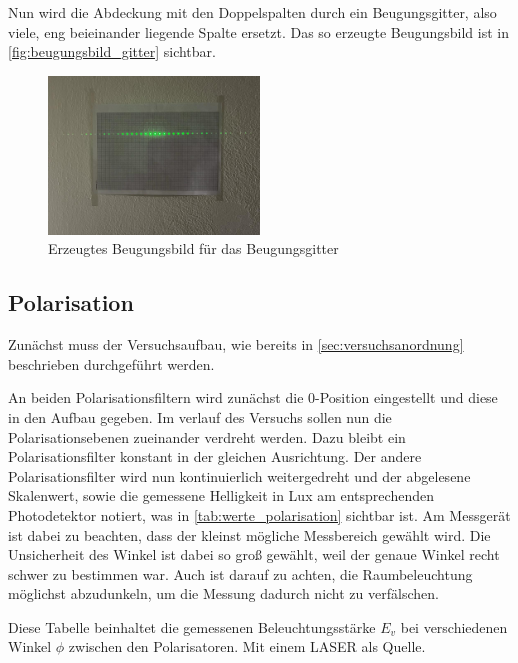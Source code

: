 \documentclass[12pt,english,ngerman]{scrartcl}
\begin{document}
Nun wird die Abdeckung mit den Doppelspalten durch ein Beugungsgitter, also
viele, eng beieinander liegende Spalte ersetzt. Das so erzeugte Beugungsbild
ist in \autoref{fig:beugungsbild_gitter} sichtbar.

\begin{figure}[H]
	\begin{center}
		\includegraphics[width =0.5\textwidth]{./figures/beugungsbild_gitter.jpg}
	\end{center}
	\caption[ Erzeugtes Beugungsbild für das Beugungsgitter] { Erzeugtes Beugungsbild für das
		Beugungsgitter
	}\label{fig:beugungsbild_gitter}
\end{figure}

\subsection{Polarisation}

Zunächst muss der Versuchsaufbau, wie bereits in
\autoref{sec:versuchsanordnung} beschrieben durchgeführt werden.

An beiden Polarisationsfiltern wird zunächst die 0-Position eingestellt und
diese in den Aufbau gegeben. Im verlauf des Versuchs sollen nun die
Polarisationsebenen zueinander verdreht werden. Dazu bleibt ein
Polarisationsfilter konstant in der gleichen Ausrichtung. Der andere
Polarisationsfilter wird nun kontinuierlich weitergedreht und der abgelesene
Skalenwert, sowie die gemessene Helligkeit in Lux am entsprechenden
Photodetektor notiert, was in \autoref{tab:werte_polarisation} sichtbar ist. Am
Messgerät ist dabei zu beachten, dass der kleinst mögliche Messbereich gewählt
wird. Die Unsicherheit des Winkel ist dabei so groß gewählt, weil der genaue
Winkel recht schwer zu bestimmen war. Auch ist darauf zu achten, die
Raumbeleuchtung möglichst abzudunkeln, um die Messung dadurch nicht zu
verfälschen.

\begin{table}[H]
	\caption{Diese Tabelle beinhaltet die gemessenen Beleuchtungsstärke $E_v$ 
  bei verschiedenen Winkel $\phi$ zwischen den Polarisatoren. Mit einem LASER 
als Quelle.}\label{tab:werte_polarisation}
	\centering
	
\end{table}
\end{document}
